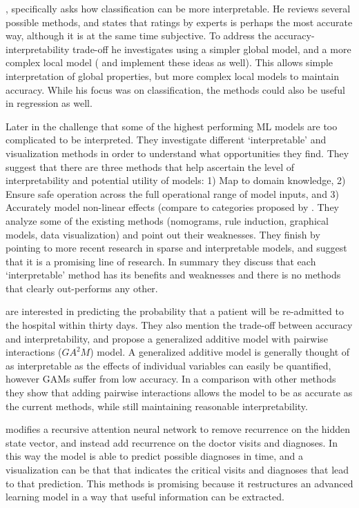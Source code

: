     \cite{Ruping2006-xj}, specifically asks how classification can be more interpretable. He reviews several possible methods, and states that ratings by experts is perhaps the most accurate way, although it is at the same time subjective. To address the accuracy-interpretability trade-off he investigates using a simpler global model, and a more complex local model (\citet{Otte2013-oo} and \cite{Ribeiro2016-uc} implement these ideas as well). This allows simple interpretation of global properties, but more complex local models to maintain accuracy. While his focus was on classification, the methods could also be useful in regression as well.

    Later in \citet{Van_Belle2013-ph} the challenge that some of the highest performing ML models are too complicated to be interpreted. They investigate different `interpretable' and visualization methods in order to understand what opportunities they find. They suggest that there are three methods that help ascertain the level of interpretability and potential utility of models: 1) Map to domain knowledge, 2) Ensure safe operation across the full operational range of model inputs, and 3) Accurately model non-linear effects (compare to categories proposed by \cite{Lipton2016-ug}. They analyze some of the existing methods (nomograms, rule induction, graphical models, data visualization) and point out their weaknesses. They finish by pointing to more recent research in sparse and interpretable models, and suggest that it is a promising line of research. In summary they discuss that each `interpretable' method has its benefits and weaknesses and there is no methods that clearly out-performs any other.

    \cite{Caruana2015-za} are interested in predicting the probability that a patient will be re-admitted to the hospital within thirty days. They also mention the trade-off between accuracy and interpretability, and propose a generalized additive model with pairwise interactions ($GA^2M$) model. A generalized additive model is generally thought of as interpretable as the effects of individual variables can easily be quantified, however GAMs suffer from low accuracy. In a comparison with other methods they show that adding pairwise interactions allows the model to be as accurate as the current methods, while still maintaining reasonable interpretability.

    \citet{Choi2016-by} modifies a recursive attention neural network to remove recurrence on the hidden state vector, and instead add recurrence on the doctor visits and diagnoses. In this way the model is able to predict possible diagnoses in time, and a visualization can be that that indicates the critical visits and diagnoses that lead to that prediction. This methods is promising because it restructures an advanced learning model in a way that useful information can be extracted.

